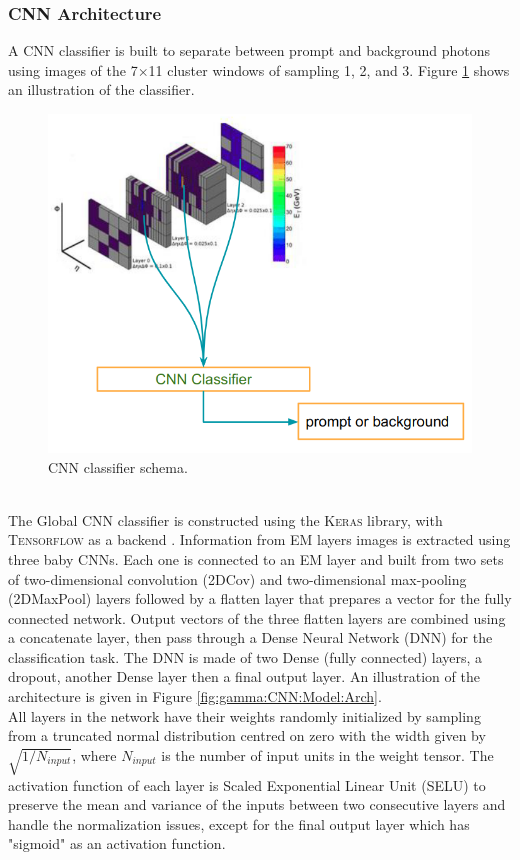 \subsubsection{CNN Architecture}
\label{gamma:CNN:Model}
A CNN classifier is built to separate between prompt and background photons using images of the 7$\times$11 cluster windows of sampling 1, 2, and 3. Figure \ref{fig:gamma:CNN:Model:Idea} shows an illustration of the classifier.
\begin{figure}[htbp]
    \centering
    \includegraphics[width=.5\textwidth]{Ch3/Img/CNN_Idea.png}
    \begin{tcolorbox}[colback=black!5!white,colframe=white!75!black]
    \caption{CNN classifier schema.}
    \label{fig:gamma:CNN:Model:Idea}
    \end{tcolorbox}
\end{figure}
\\
The Global CNN classifier is constructed using the \textsc{Keras} library, with \textsc{Tensorflow} as a backend \cite{keras, tensorflow}. Information from EM layers images is extracted using three baby CNNs. Each one is connected to an EM layer and built from two sets of two-dimensional convolution (2DCov) and two-dimensional max-pooling (2DMaxPool) \cite{maxpooling} layers followed by a flatten layer that prepares a vector for the fully connected network. Output vectors of the three flatten layers are combined using a concatenate layer, then pass through a Dense Neural Network (DNN) for the classification task. The DNN is made of two Dense (fully connected) layers, a dropout, another Dense layer then a final output layer. An illustration of the architecture is given in Figure \ref{fig:gamma:CNN:Model:Arch}. \\
All layers in the network have their weights randomly initialized by sampling from a truncated normal distribution centred on zero with the width given by $\sqrt{1/N_{input}}$, where $N_{input}$ is the number of input units in the weight tensor. The activation function of each layer is Scaled Exponential Linear Unit (SELU) \cite{SELU} to preserve the mean and variance of the inputs between two consecutive layers and handle the normalization issues, except for the final output layer which has "sigmoid" as an activation function.\\
